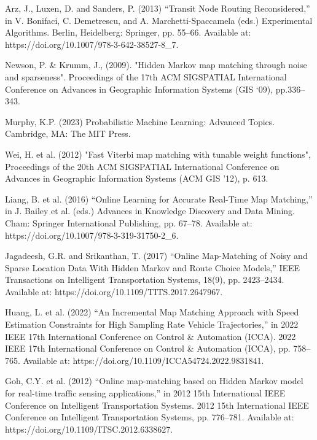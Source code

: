 \begin{thebibliography}{99}
        Arz, J., Luxen, D. and Sanders, P. (2013) “Transit Node Routing Reconsidered,” in V. Bonifaci, C. Demetrescu, and A. Marchetti-Spaccamela (eds.) Experimental Algorithms. Berlin, Heidelberg: Springer, pp. 55–66. Available at: https://doi.org/10.1007/978-3-642-38527-8\_7.

        Newson, P. \& Krumm, J., (2009). "Hidden Markov map matching through noise and sparseness". Proceedings of the 17th ACM SIGSPATIAL International Conference on Advances in Geographic Information Systems (GIS ‘09), pp.336–343.

        Murphy, K.P. (2023) Probabilistic Machine Learning: Advanced Topics. Cambridge, MA: The MIT Press.

        Wei, H. et al. (2012) "Fast Viterbi map matching with tunable weight functions", Proceedings of the 20th ACM SIGSPATIAL International Conference on Advances in Geographic Information Systems (ACM GIS '12), p. 613.

        Liang, B. et al. (2016) “Online Learning for Accurate Real-Time Map Matching,” in J. Bailey et al. (eds.) Advances in Knowledge Discovery and Data Mining. Cham: Springer International Publishing, pp. 67–78. Available at: https://doi.org/10.1007/978-3-319-31750-2\_6.
    
        Jagadeesh, G.R. and Srikanthan, T. (2017) “Online Map-Matching of Noisy and Sparse Location Data With Hidden Markov and Route Choice Models,” IEEE Transactions on Intelligent Transportation Systems, 18(9), pp. 2423–2434. Available at: https://doi.org/10.1109/TITS.2017.2647967.


        Huang, L. et al. (2022) “An Incremental Map Matching Approach with Speed Estimation Constraints for High Sampling Rate Vehicle Trajectories,” in 2022 IEEE 17th International Conference on Control \& Automation (ICCA). 2022 IEEE 17th International Conference on Control \& Automation (ICCA), pp. 758–765. Available at: https://doi.org/10.1109/ICCA54724.2022.9831841.

    
        Goh, C.Y. et al. (2012) “Online map-matching based on Hidden Markov model for real-time traffic sensing applications,” in 2012 15th International IEEE Conference on Intelligent Transportation Systems. 2012 15th International IEEE Conference on Intelligent Transportation Systems, pp. 776–781. Available at: https://doi.org/10.1109/ITSC.2012.6338627.


\end{thebibliography}
